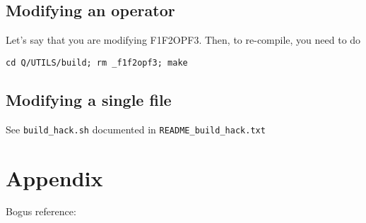 \subsection{Modifying an operator}
Let's say that you are modifying F1F2OPF3. Then, to re-compile, you need to do 
\begin{verbatim}
cd Q/UTILS/build; rm _f1f2opf3; make 
\end{verbatim}

\subsection{Modifying a single file}
See \verb+build_hack.sh+ documented in \verb+README_build_hack.txt+

\section{Appendix}

Bogus reference: \cite{sarawagi99}

 




